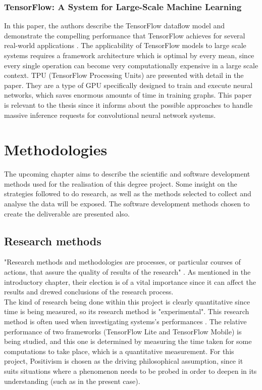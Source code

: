 \subsubsection{TensorFlow: A System for Large-Scale Machine Learning}
In this paper, the authors describe the TensorFlow dataflow model and demonstrate the compelling performance that TensorFlow achieves for several real-world applications \cite{abadi2016tensorflow}. The applicability of TensorFlow models to large scale systems requires a framework architecture which is optimal by every mean, since every single operation can become very computationally expensive in a large scale context. TPU (TensorFlow Processing Units) are presented with detail in the paper. They are a type of GPU specifically designed to train and execute neural networks, which saves enormous amounts of time in training graphs. This paper is relevant to the thesis since it informs about the possible approaches to handle massive inference requests for convolutional neural network systems.

\newpage
\section{Methodologies}\label{sec:method}
The upcoming chapter aims to describe the scientific and software development methods used for the realisation of this degree project. Some insight on the strategies followed to do research, as well as the methods selected to collect and analyse the data will be exposed. The software development methods chosen to create the deliverable are presented also.

\subsection{Research methods}
"Research methods and methodologies are processes, or particular courses of actions, that assure the quality of results of the research" \cite{haakansson}. As mentioned in the introductory chapter, their election is of a vital importance since it can affect the results and drewed conclusions of the research process. \\

The kind of research being done within this project is clearly quantitative since time is being measured, so its research method is "experimental". This research method is often used when investigating systems's performances \cite{haakansson}. The relative performance of two frameworks (TensorFlow Lite and TensorFlow Mobile) is being studied, and this one is determined by measuring the time taken for some computations to take place, which is a quantitative measurement. For this project, Positivism is chosen as the driving philosophical assumption, since it suits situations where a phenomenon needs to be probed in order to deepen in its understanding (such as in the present case).

